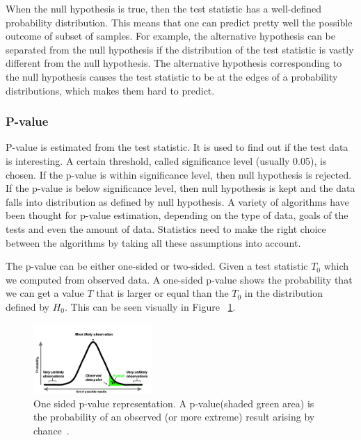 \documentclass[12pt]{article}
\begin{document}
{When the null hypothesis is true, then the test statistic has a well-defined probability distribution. This means that one can predict pretty well the possible outcome of subset of samples. For example, the alternative hypothesis can be separated from the null hypothesis if the distribution of the test statistic is vastly different from the null hypothesis. The alternative hypothesis corresponding to the null hypothesis causes the test statistic to be at the edges of a probability distributions, which makes them hard to predict.

\subsubsection{P-value}
P-value is estimated from the test statistic. It is used to find out if the test data is interesting. A certain threshold, called significance level (usually 0.05), is chosen. If the p-value is within significance level, then null hypothesis is rejected. If the p-value is below significance level, then null hypothesis is kept and the data falls into distribution as defined by null hypothesis. A variety of algorithms have been thought for p-value estimation, depending on the type of data, goals of the tests and even the amount of data. Statistics need to make the right choice between the algorithms by taking all these assumptions into account.

The p-value can be either one-sided or two-sided. Given a test statistic $T_0$ which we computed from observed data. A one-sided p-value shows the probability that we can get a value $T$ that is larger or equal than the $T_0$ in the distribution defined by $H_0$. This can be seen visually in Figure ~\ref{fig:p_value_one_sided}.

\begin{figure}[H]
  \centering
  \includegraphics[width=0.4\textwidth]{p_value_one_sided}
  \caption{One sided p-value representation. A p-value(shaded green area) is the probability of an observed (or more extreme) result arising by chance~\cite{p_value_pic_cite}.}
  \label{fig:p_value_one_sided}
\end{figure}

}
\end{document}
